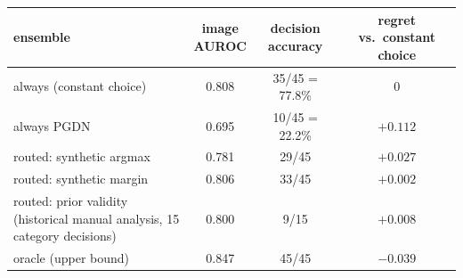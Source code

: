 \setlength{\tabcolsep}{3pt}
\begin{tabular}{@{}lccc@{}}
\toprule
ensemble & \shortstack{image\\AUROC} & decision accuracy & regret vs.\ constant choice \\
\midrule
always \draem{} (constant choice) & 0.808 & 35/45 = 77.8\% & $0$ \\
always PGDN & 0.695 & 10/45 = 22.2\% & $+0.112$ \\
routed: synthetic argmax & 0.781 & 29/45 & $+0.027$ \\
routed: synthetic margin & 0.806 & 33/45 & $+0.002$ \\
routed: prior validity (historical manual analysis, 15 category decisions) & 0.800 & 9/15 & $+0.008$ \\
oracle (upper bound) & 0.847 & 45/45 & $-0.039$ \\
\bottomrule
\end{tabular}
